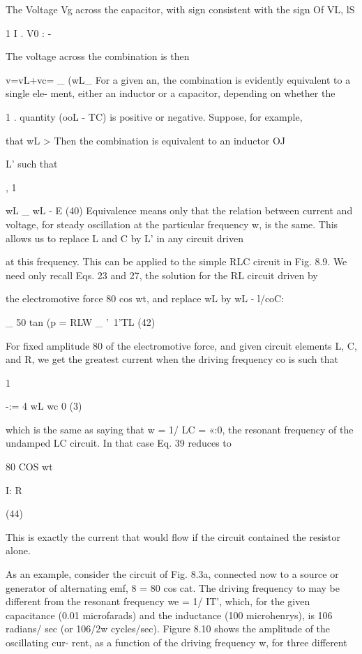The Voltage Vg across the capacitor, with sign consistent with the sign
Of VL, lS

1 I .
V0 : - %

The voltage across the combination is then

v=vL+vc= _ (wL_%
For a given an, the combination is evidently equivalent to a single ele-
ment, either an inductor or a capacitor, depending on whether the

1 .
quantity (ooL - TC) is positive or negative. Suppose, for example,

that wL >  Then the combination is equivalent to an inductor
OJ

L' such that

, 1

wL _ wL - E (40)
Equivalence means only that the relation between current and
voltage, for steady oscillation at the particular frequency w, is the
same. This allows us to replace L and C by L' in any circuit driven

at this frequency.
This can be applied to the simple RLC circuit in Fig. 8.9. We need
only recall Eqs. 23 and 27, the solution for the RL circuit driven by

the electromotive force 80 cos wt, and replace wL by wL - l/coC:

_ 50
tan (p = RLW _ '~1'TL (42)

For fixed amplitude 80 of the electromotive force, and given circuit
elements L, C, and R, we get the greatest current when the driving
frequency co is such that

1

-:= 4
wL wc 0 (3)

which is the same as saying that w = 1/ LC = «:0, the resonant
frequency of the undamped LC circuit. In that case Eq. 39 reduces to

80 COS wt

I: R

(44)

This is exactly the current that would flow if the circuit contained
the resistor alone.

As an example, consider the circuit of Fig. 8.3a, connected now
to a source or generator of alternating emf, 8 = 80 cos cat. The driving
frequency to may be different from the resonant frequency
we = 1/ \/IT', which, for the given capacitance (0.01 microfarads)
and the inductance (100 microhenrys), is 106 radians/ sec (or 106/2w
cycles/sec). Figure 8.10 shows the amplitude of the oscillating cur-
rent, as a function of the driving frequency w, for three different

